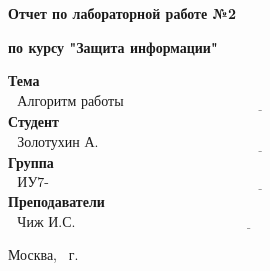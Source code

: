 \begin{center}
	\Large\textbf{Отчет по лабораторной работе №2}
	
	\Large\textbf {по курсу "Защита информации"}
\end{center}


\noindent\textbf{Тема} $\underline{\text{~~Алгоритм работы DES~~~~~~~~~~~~~~~~~~`~~~~~~~~~~~~~~~~~~~~~~~~~~~~~~~~~~~~~~~~~~~~~~~~~~~~~~~~~~~~~~~~~~~~}}$\newline\newline
\noindent\textbf{Студент} $\underline{\text{~~Золотухин А. В.~~~~~~~~~~~~~~~~~~~~~~~~~~~~~~~~~~~~~~~~~~~~~~~~~~~~~~~~~~~~~~~~~~~~~~~~~~~~~~~~~~~~~~~~~~}}$\newline\newline
\noindent\textbf{Группа} $\underline{\text{~~ИУ7-74Б~~~~~~~~~~~~~~~~~~~~~~~~~~~~~~~~~~~~~~~~~~~~~~~~~~~~~~~~~~~~~~~~~~~~~~~~~~~~~~~~~~~~~~~~~~~~~~~~~~~~~~}}$\newline\newline
\noindent\textbf{Преподаватели} $\underline{\text{~~Чиж И.С. ~~~~~~~~~~~~~~~~~~~~~~~~~~~~~~~~~~~~~~~~~~~~~~~~~~~~~~~~~~~~~~~~~~~~~~~~~~~~~~~~~~~~~~~~}}$\newline

\begin{center}
	\vfill
	Москва, \the\year
	~г.
\end{center}
\restoregeometry